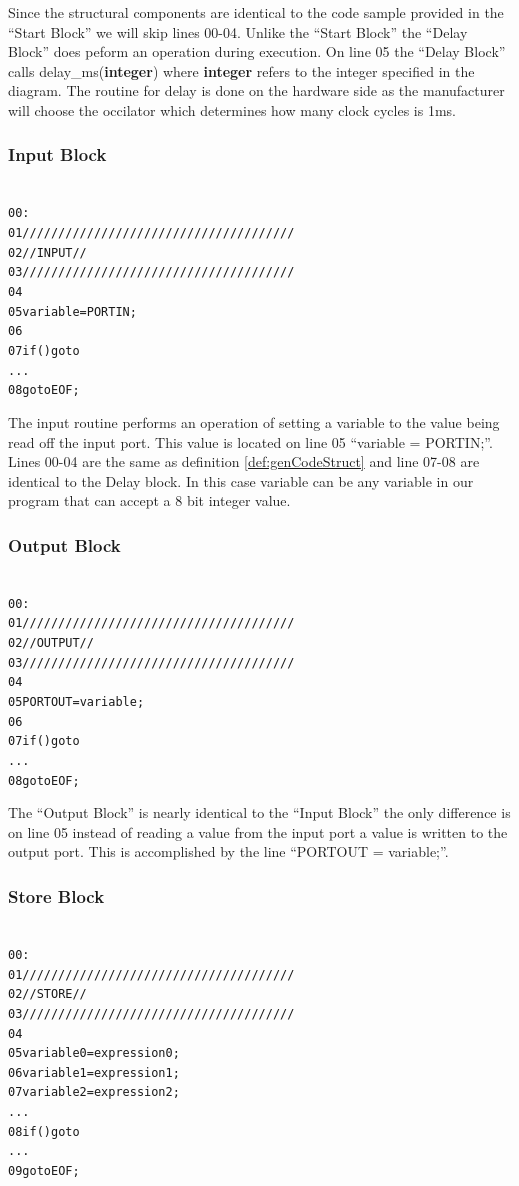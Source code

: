 Since the structural components are identical to the code sample provided in the ``Start Block'' we will skip lines 00-04. Unlike the ``Start Block'' the ``Delay Block'' does peform an operation during execution. On line 05 the ``Delay Block'' calls delay\_ms(\textbf{integer}) where \textbf{integer} refers to the integer specified in the diagram. The routine for delay is done on the hardware side as the manufacturer will choose the occilator which determines how many clock cycles is 1ms.

\subsubsection{Input Block}
\begin{alltt}
\label{def:cmpinputblock}
00 :
01 //////////////////////////////////////
02 //        INPUT                     //
03 //////////////////////////////////////
04
05 variable = PORTIN;
06 
07 if () goto 
     ...
08 goto EOF;
\end{alltt}

The input routine performs an operation of setting a variable to the value being read off the input port. This value is located on line 05 ``variable = PORTIN;''. Lines 00-04 are the same as definition \ref{def:genCodeStruct} and line 07-08 are identical to the Delay block. In this case variable can be any variable in our program that can accept a 8 bit integer value.


\subsubsection{Output Block}
\begin{alltt}
\label{def:cmpoutputblock}
00 :
01 //////////////////////////////////////
02 //        OUTPUT                    //
03 //////////////////////////////////////
04
05 PORTOUT = variable;
06 
07 if () goto 
     ...
08 goto EOF;
\end{alltt}

The ``Output Block'' is nearly identical to the ``Input Block'' the only difference is on line 05 instead of reading a value from the input port a value is written to the output port. This is accomplished by the line ``PORTOUT = variable;''.

\subsubsection{Store Block}
\begin{alltt}
\label{def:cmpstoreblock}
00 :
01 //////////////////////////////////////
02 //        STORE                     //
03 //////////////////////////////////////
04
05 variable0 = expression0;
06 variable1 = expression1;
07 variable2 = expression2;
     ...
08 if () goto 
     ...
09 goto EOF;
\end{alltt}

